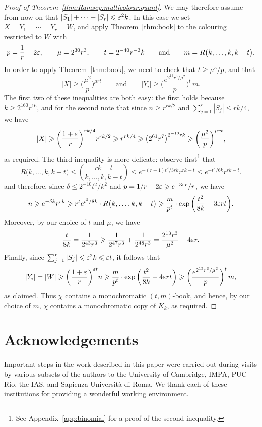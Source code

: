 \begin{proof}[Proof of Theorem~\ref{thm:Ramsey:multicolour:quant}]
We may therefore assume from now on that  $|S_1| + \cdots + |S_r| \leqslant \varepsilon^2 k$. 
In this case we set $X = Y_1 = \cdots = Y_r = W$, and apply Theorem~\ref{thm:book} to the colouring restricted to $W$ with 
$$p = \frac{1}{r} - 2\varepsilon, \qquad \mu = 2^{30} r^3, \qquad t = 2^{-40} r^{-3} k \qquad \text{and} \qquad m = R\big( k, \ldots, k, k - t \big).$$
In order to apply Theorem~\ref{thm:book}, we need to check that $t \ge \mu^5/p$, and that
$$|X| \ge \bigg( \frac{\mu^2}{p} \bigg)^{\mu r t} \qquad \text{and} \qquad |Y_i| \ge \bigg( \frac{e^{2^{13} r^3 / \mu^2}}{p} \bigg)^t \, m.$$
The first two of these inequalities are both easy: the first holds because $k \ge 2^{160} r^{16}$, and for the second note that since $n \ge r^{rk/2}$ and $\sum_{j = 1}^r |S_j| \le rk/4$, we have
$$|X| \geqslant \bigg( \frac{1+\varepsilon}{r} \bigg)^{rk/4} r^{rk/2} \geqslant r^{rk/4} \geqslant \big( 2^{61} r^7 \big)^{2^{-10} r k} \geqslant \bigg( \frac{\mu^2}{p} \bigg)^{\mu r t},$$
as required. The third inequality is more delicate: observe first\footnote{See Appendix~\ref{app:binomial} for a proof of the second inequality.} that 
$$R\big( k, \ldots, k, k-t \big) \le \binom{rk-t}{k,\dots,k,k-t} \le e^{-(r-1)t^2/3rk} r^{rk-t} \le e^{-t^2/6k} r^{rk-t}.$$
and therefore, since $\delta \le 2^{-10} t^2/k^2$ and $p = 1/r - 2\varepsilon \geqslant e^{-3\varepsilon r} / r$, we have 
$$n \geqslant e^{-\delta k} r^{rk} \geqslant r^t e^{t^2/8k} \cdot R\big( k, \ldots, k, k-t \big) \geqslant \frac{m}{p^t} \cdot \exp\bigg( \frac{t^2}{8k} - 3\varepsilon r t \bigg).$$
Moreover, by our choice of $t$ and $\mu$, we have 
$$\frac{t}{8k} = \frac{1}{2^{43} r^3} \geqslant \frac{1}{2^{47}r^3} + \frac{1}{2^{48}r^3} = \frac{2^{13} r^3}{\mu^2} + 4\varepsilon r.$$
Finally, since $\sum_{j = 1}^r |S_j| \leqslant \varepsilon^2 k \leqslant \varepsilon t$, it follows that
$$|Y_i| = |W| \geqslant \bigg( \frac{1+\varepsilon}{r} \bigg)^{\varepsilon t} n \geqslant \frac{m}{p^t} \cdot \exp\bigg( \frac{t^2}{8k} - 4\varepsilon r t \bigg) \geqslant \bigg( \frac{e^{2^{13} r^3 / \mu^2}}{p} \bigg)^t \, m,$$
as claimed. Thus $\chi$ contains a monochromatic $(t,m)$-book, and hence, by our choice of $m$, $\chi$ contains a monochromatic copy of $K_k$, as required.
\end{proof}

\section*{Acknowledgements}

Important steps in the work described in this paper were carried out during visits by various subsets of the authors to the University of Cambridge, IMPA, PUC-Rio, the IAS, %
and Sapienza Università di Roma. We thank each of these institutions for providing a wonderful working environment.

\appendix